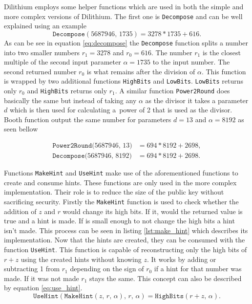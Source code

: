 Dilithium employs some helper functions which are used in both the simple and more complex versions of Dilithium. The first one is \texttt{Decompose} and can be well explained using an example
\begin{equation}
  \label{eq:decompose}
  \mathrm{\texttt{Decompose}}(5687946,\,1735)=3278*1735+616.
\end{equation}
\noindent As can be see in equation \ref{eq:decompose} the \texttt{Decompose} function splits a number into two smaller numbers $r_1=3278$ and $r_0=616$. The number $r_1$ is the closest multiple of the second input parameter $\alpha=1735$ to the input number. The second returned number $r_0$ is what remains after the division of $\alpha$. This function is wrapped by two additional functions \texttt{HighBits} and \texttt{LowBits}. \texttt{LowBits} returns only $r_0$ and \texttt{HighBits} returns only $r_1$. A similar function \texttt{Power2Round} does basically the same but instead of taking any $\alpha$ as the divisor it takes a parameter $d$ which is then used for calculating a~power of 2 that is used as the divisor. Booth function output the same number for parameters $d=13$ and $\alpha=8192$ as seen bellow

\begin{align}
  \mathrm{\texttt{Power2Round}}(5687946,\,13\mathrm) & =694*8192+2698, \\
  \mathrm{\texttt{Decompose}}(5687946,\,8192\mathrm) & =694*8192+2698.
\end{align}

Functions \texttt{MakeHint} and \texttt{UseHint} make use of the aforementioned functions to create and consume hints. These functions are only used in the more complex implementation. Their role is to reduce the size of the public key without sacrificing security. Firstly the \texttt{MakeHint} function is used to check whether the addition of $z$ and $r$ would change its high bits. If it, would the returned value is true and a hint is made. If is small enough to not change the high bits a hint isn't made. This process can be seen in listing \ref{lst:make_hint} which describes its implementation.
\newpage
{}
\noindent Now that the hints are created, they can be consumed with the function \texttt{UseHint}. This function is capable of reconstructing only the high bits of $r+z$ using the created hints without knowing $z$. It works by adding or subtracting 1 from $r_1$ depending on the sign of $r_0$ if a hint for that number was made. If it was not made $r_1$ stays the same. This concept can also be described by equation \ref{eq:use_hint}.
\begin{equation}
  \label{eq:use_hint}
  \mathrm{\texttt{UseHint}}(\mathrm{\texttt{MakeHint}}(z,\,r,\,\alpha),\,r,\,\alpha)=\mathrm{\texttt{HighBits}}(r+z,\,\alpha).
\end{equation}
